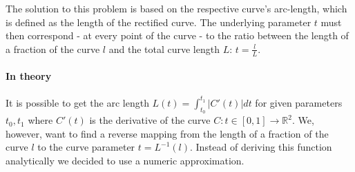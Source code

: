 The solution to this problem is based on the respective curve's arc-length, which is defined as the length of the rectified curve. The underlying parameter $t$ must then correspond - at every point of the curve - to the ratio between the length of a fraction of the curve $l$ and the total curve length $L$: $t = \frac{l}{L}$.

\paragraph{In theory}
It is possible to get the arc length $L(t)=\int_{t_{0}}^{t_{1}} \left|C'(t)\right| dt$ for given parameters $t_{0}, t_{1}$ where $C'(t)$ is the derivative of the curve $C:t \in [0,1] \rightarrow \mathbb{R}^2$. We, however, want to find a reverse mapping from the length of a fraction of the curve $l$ to the curve parameter $t = L^{-1}(l)$. 
Instead of deriving this function analytically we decided to use a numeric approximation.
